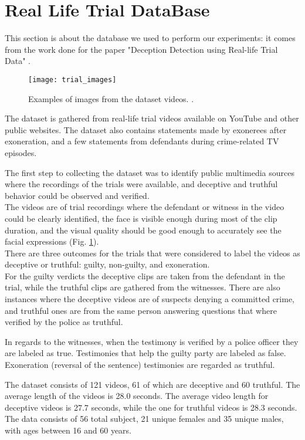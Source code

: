 \section{Real Life Trial DataBase} \label{rldb}
This section is about the database we used to perform our experiments: it comes from the work done for the paper "Deception Detection using Real-life Trial Data" \cite{Perez-Rosas:2015:DDU:2818346.2820758}.

\begin{figure}[H]
	\centering
	\texttt{[image: trial\_images]}
	\caption{Examples of images from the dataset videos. \cite{Perez-Rosas:2015:DDU:2818346.2820758}.}
	\label{fig:trial_images}
\end{figure}


The dataset is gathered from real-life trial videos available on YouTube and other public websites. The dataset also contains statements made by exonerees after exoneration, and a few statements from defendants during crime-related TV episodes.

The first step to collecting the dataset was to identify public multimedia sources where the recordings of the trials were available, and deceptive and truthful behavior could be observed and verified.\\
The videos are of trial recordings where the defendant or witness in the video could be clearly identified, the face is visible enough during most of the clip duration, and the visual quality should be good enough to accurately see the facial expressions (Fig. \ref{fig:trial_images}).\\
There are three outcomes for the trials that were considered to label the videos as deceptive or truthful: guilty, non-guilty, and exoneration. \\
For the guilty verdicts the deceptive clips are taken from the defendant in the trial, while the truthful clips are gathered from the witnesses. There are also instances where the deceptive videos are of suspects denying a committed crime, and truthful ones are from the same person answering questions that where verified by the police as truthful.

In regards to the witnesses, when the testimony is verified by a police officer they are labeled as true. Testimonies that help the guilty party are labeled as false. Exoneration (reversal of the sentence) testimonies are regarded as truthful.

The dataset consists of 121 videos, 61 of which are deceptive and 60 truthful. The average length of the videos is 28.0 seconds. The average video length for deceptive videos is 27.7 seconds, while the one for truthful videos is 28.3 seconds. The data consists of 56 total subject, 21 unique females and 35 unique males, with ages between 16 and 60 years.

